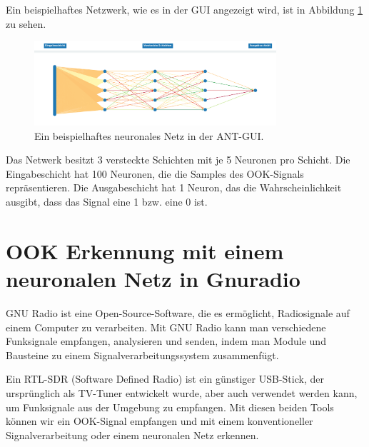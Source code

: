 Ein beispielhaftes Netzwerk, wie es in der GUI angezeigt wird, ist in Abbildung \ref{fig:gui_network} zu sehen.

\begin{figure}[h]
    \centering
    \includegraphics[width=0.8\textwidth]{images/GUI_network.png}
    \caption{Ein beispielhaftes neuronales Netz in der ANT-GUI.}
    \label{fig:gui_network}
\end{figure}

Das Netwerk besitzt 3 versteckte Schichten mit je 5 Neuronen pro Schicht. Die Eingabeschicht hat 100 Neuronen, die die Samples des OOK-Signals repräsentieren. Die Ausgabeschicht hat 1 Neuron, das die Wahrscheinlichkeit ausgibt, dass das Signal eine 1 bzw. eine 0 ist.


\section{OOK Erkennung mit einem neuronalen Netz in Gnuradio}

GNU Radio ist eine Open-Source-Software, die es ermöglicht, Radiosignale auf einem Computer zu verarbeiten. Mit GNU Radio kann man verschiedene Funksignale empfangen, analysieren und senden, indem man Module und Bausteine zu einem Signalverarbeitungssystem zusammenfügt.

Ein RTL-SDR (Software Defined Radio) ist ein günstiger USB-Stick, der ursprünglich als TV-Tuner entwickelt wurde, aber auch verwendet werden kann, um Funksignale aus der Umgebung zu empfangen. Mit diesen beiden Tools können wir ein OOK-Signal empfangen und mit einem konventioneller Signalverarbeitung oder einem neuronalen Netz erkennen.





